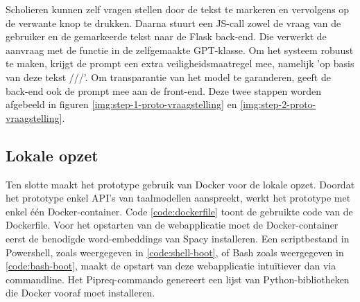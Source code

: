 \medspace

Scholieren kunnen zelf vragen stellen door de tekst te markeren en vervolgens op de verwante knop te drukken. Daarna stuurt een JS-call zowel de vraag van de gebruiker en de gemarkeerde tekst naar de Flask back-end. Die verwerkt de aanvraag met de functie in de zelfgemaakte GPT-klasse. Om het systeem robuust te maken, krijgt de prompt een extra veiligheidsmaatregel mee, namelijk 'op basis van deze tekst ///'. Om transparantie van het model te garanderen, geeft de back-end ook de prompt mee aan de front-end. Deze twee stappen worden afgebeeld in figuren \ref{img:step-1-proto-vraagstelling} en \ref{img:step-2-proto-vraagstelling}.

\medspace

\subsection{Lokale opzet}

Ten slotte maakt het prototype gebruik van Docker voor de lokale opzet. Doordat het prototype enkel API's van taalmodellen aanspreekt, werkt het prototype met enkel één Docker-container. Code \ref{code:dockerfile} toont de gebruikte code van de Dockerfile. Voor het opstarten van de webapplicatie moet de Docker-container eerst de benodigde word-embeddings van Spacy installeren. Een scriptbestand in Powershell, zoals weergegeven in \ref{code:shell-boot}, of Bash zoals weergegeven in \ref{code:bash-boot}, maakt de opstart van deze webapplicatie intuïtiever dan via commandline. Het Pipreq-commando genereert een lijst van Python-bibliotheken die Docker vooraf moet installeren. 